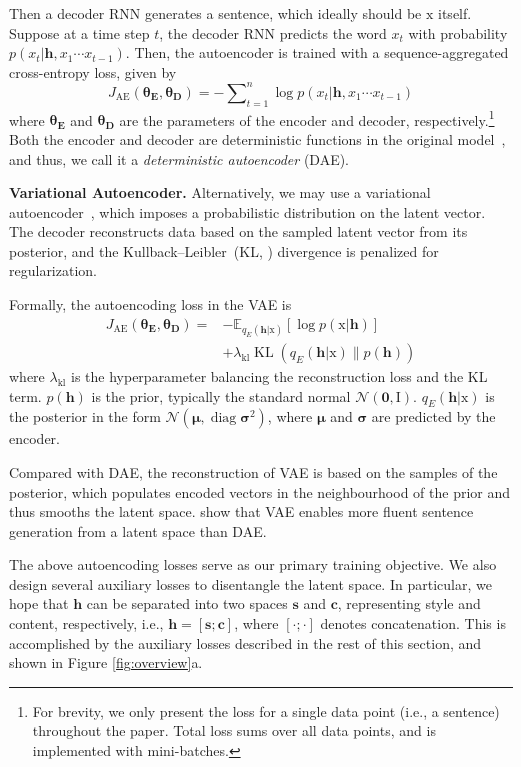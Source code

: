\documentclass[11pt,a4paper]{article}
\newcommand{\rmx}{\mathrm x}
\newcommand{\loss}[1]{J_{\text{#1}}}
\newcommand{\hyp}[1]{\lambda_{\text{#1}}}
\newcommand{\nnweight}[1]{\bm{\theta_{\text{#1}}}}
\begin{document}
Then a decoder RNN generates a sentence, which ideally should be $\rmx$ itself.
Suppose at a time step $t$, the decoder RNN predicts the word $x_t$ with probability $p(x_t|\bm h, x_1\cdots x_{t-1})$. Then, the autoencoder is trained with a sequence-aggregated cross-entropy loss, given by
\begin{equation}\nonumber
	\loss{AE}(\nnweight{E},\nnweight{D})= -\sum\nolimits_{t=1}^n \log p(x_t|\bm h, x_1\cdots x_{t-1})
\end{equation}
where $\nnweight{E}$ and $\nnweight{D}$ are the parameters of the encoder and decoder, respectively.\footnote{For brevity, we only present the loss for a single data point (i.e., a sentence) throughout the paper. Total loss sums over all data points, and is implemented with mini-batches.} Both the encoder and decoder are deterministic functions in the original model~\cite{rumelhart1985learning}, and thus, we call it a \textit{deterministic autoencoder} (DAE).


\textbf{Variational Autoencoder.} Alternatively, we may use a variational autoencoder~\cite[VAE,][]{kingma2013auto}, which imposes a probabilistic distribution on the latent vector. The decoder reconstructs data based on the sampled latent vector from its posterior, and the Kullback--Leibler~(KL, \citeyear{kullback1951information}) divergence  is penalized for regularization.

Formally, the autoencoding loss in the VAE is
\begin{align}
	\loss{AE}(\nnweight{E}, \nnweight{D}) = & - \mathbb{E}_{q_{E}(\bm h|\rmx)} [\log p(\rmx|\bm h)]  \nonumber \\ \nonumber
	                                        & + \hyp{kl}\operatorname{KL}(q_{E}(\bm h|\rmx)\|p(\bm h))
\end{align}
where $\hyp{kl}$ is the hyperparameter balancing the reconstruction loss and the KL term. $p(\bm h)$ is the prior, typically the standard normal  $\mathcal{N}(\bm 0,\mathrm I)$. $q_E(\bm h|\mathrm x)$ is the posterior in the form $\mathcal{N}(\bm \mu,\operatorname{diag} \bm\sigma^2)$, where $\bm\mu$ and $\bm\sigma$ are predicted by the encoder.

Compared with DAE, the reconstruction of VAE is based on the samples of the posterior, which populates encoded vectors in the neighbourhood of the prior and thus smooths the latent space.
\citet{bowman2016generating} show that VAE enables more fluent sentence generation from a latent space than DAE.

The above autoencoding losses serve as our primary training objective.
We also design several auxiliary losses to disentangle the latent space. In particular, we hope that $\bm h$ can be separated into two spaces $\bm s$ and $\bm c$, representing style and content, respectively, i.e., $\bm h = [\bm s ; \bm c]$, where $[\cdot;\cdot]$ denotes concatenation.
This is accomplished by the auxiliary losses described in the rest of this section, and shown in Figure \ref{fig:overview}a.
\end{document}
